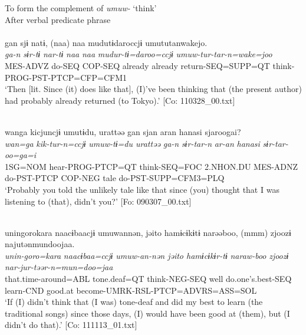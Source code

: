 \begin{xlist}
\ea\label{ex:10.69}   To form the complement of \textit{umuw-} ‘think’\\
   After verbal predicate phrase\\
  \ea\relax  [= (10-52 b)]\\
      \glll    gan  sjɨ  natɨ,  (naa)  naa  mudutɨdaroccjɨ umututanwakejo.\\
      \textit{ga-n}  \textit{sɨr-tɨ}  \textit{nar-tɨ}  \textit{naa}  \textit{naa}  \textit{mudur-tɨ=daroo=ccjɨ} \textit{umuw{}-tur-tar-n=wake=joo}\\
      MES-ADVZ  do-SEQ  COP-SEQ  already  already  return-SEQ=SUPP=QT  think-PROG-PST-PTCP=CFP=CFM1\\      
      \glt ‘Then [lit. Since (it) does like that], (I)’ve been thinking that (the present author) had probably already returned (to Tokyo).’  [Co: 110328\_00.txt]

  \ex\relax  [= (8-41)]\\
      \glll    wanga  kicjuncjɨ  umutɨdu,  urattəə  gan  sjan  aran  hanasi  sjaroogai?\\
      \textit{wan=ga}  \textit{kik-tur-n=ccjɨ}  \textit{umuw{}-tɨ=du  urattəə}   \textit{ga-n}  \textit{sɨr-tar-n}  \textit{ar-an}  \textit{hanasi}  \textit{sɨr-tar-oo=ga=i}\\
      1SG=NOM  hear-PROG-PTCP=QT  think-SEQ=FOC  2.NHON.DU  MES-ADNZ  do-PST-PTCP  COP-NEG  tale  do-PST-SUPP=CFM3=PLQ\\
      \glt       ‘Probably you told the unlikely tale like that since (you) thought that I was listening to (that), didn’t you?’ [Fo: 090307\_00.txt]

  \ex\relax [= (8-141 b)]\\
      \glll    unin{\textbar}goro{\textbar}kara  naacɨbaacjɨ  umuwannən,  jəito  hamɨcɨkɨtɨ narəəboo,  (mmm)  zjoozɨ  najutənmundoojaa.\\
      \textit{unin-goro=kara}  \textit{naacɨbaa=ccjɨ}  \textit{umuw{}-an-nən  jəito  hamɨcɨkɨr-tɨ}   \textit{naraw-boo}    \textit{zjoozɨ}  \textit{nar-jur-təər-n=mun=doo=jaa}\\
      that.time-around=ABL  tone.deaf=QT  think-NEG-SEQ  well  do.one’s.best-SEQ  learn-CND    good.at  become-UMRK-RSL-PTCP=ADVRS=ASS=SOL\\
      \glt       ‘If (I) didn’t think that (I was) tone-deaf and did my best to learn (the traditional songs) since those days, (I) would have been good at (them), but (I didn’t do that).’ [Co: 111113\_01.txt]
    \z
\z


\end{xlist}
